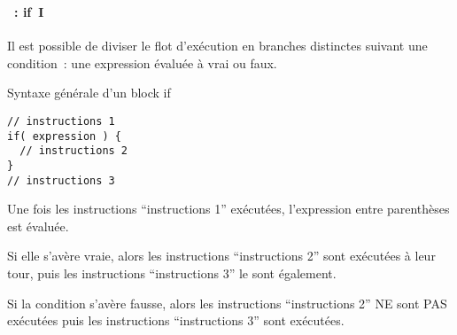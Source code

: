 \begin{frame}[containsverbatim]
  \frametitle{\secname}
  \framesubtitle{\subsecname~: if~I}

  Il est possible de diviser le flot d'exécution en branches distinctes suivant une condition~: une expression évaluée à vrai ou faux.
  \begin{block}{Syntaxe générale d'un block if}
    \begin{verbatim}
// instructions 1
if( expression ) {
  // instructions 2
}
// instructions 3\end{verbatim}
  \end{block}
  \par
  Une fois les instructions ``instructions 1'' exécutées, l'expression entre parenthèses est évaluée. 
  \par
  Si elle s'avère vraie, alors les instructions ``instructions 2'' sont exécutées à leur tour, puis les instructions ``instructions 3'' le sont également.
  \par 
  Si la condition s'avère fausse, alors les instructions ``instructions 2'' NE sont PAS exécutées puis les instructions ``instructions 3'' sont exécutées.
\end{frame}

